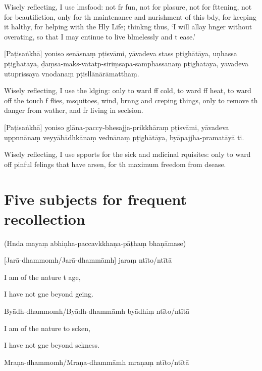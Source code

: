 Wisely reflecting, I use lmsfood: not fr fun, not for plasure, not for fttening, not for beautifiction, only for th maintenance and nurishment of this bdy, for keeping it halthy, for helping with the Hly Life; thinkng thus, `I will allay hnger without overating, so that I may cntinue to live blmelessly and t ease.'

[Paṭisaṅkhā] yoniso senāsnaṃ pṭisvāmi, yāvadeva stass pṭighātāya, uṇhassa pṭighātāya, ḍaṃsa-maks-vātātp-siriṃsapa-samphassānaṃ pṭighātāya, yāvadeva utuprissaya vnodanaṃ pṭisllānārāmatthaṃ.

Wisely reflecting, I use the ldging: only to ward ff cold, to ward ff heat, to ward off the touch f flies, msquitoes, wind, brnng and creping things, only to remove th danger from wather, and fr living in seclsion.

[Paṭisaṅkhā] yoniso glāna-paccy-bhesajja-prikkhāraṃ pṭisvāmi, yāvadeva uppnnānaṃ veyyābādhkānaṃ vednānaṃ pṭighātāya, byāpajjha-pramatāyā ti.

Wisely reflecting, I use spports for the sick and mdicinal rquisites: only to ward off pinful felings that have arsen, for th maximum freedom from dsease.

\chapter[Five subjects]{Five subjects for frequent recollection}

(Hnda mayaṃ abhiṇha-paccavkkhaṇa-pāṭhaṃ bhaṇāmase)

[Jarā-dhammomh/Jarā-dhammāmh] jaraṃ ntīto/ntītā

I am of the nature t age,

I have not gne beyond geing.

Byādh-dhammomh/Byādh-dhammāmh byādhiṃ ntīto/ntītā

I am of the nature to scken,

I have not gne beyond sckness.

Mraṇa-dhammomh/Mraṇa-dhammāmh mraṇaṃ ntīto/ntītā

